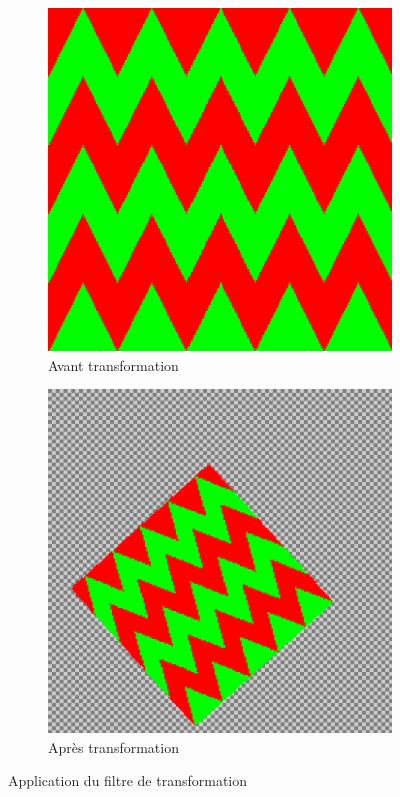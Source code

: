 \documentclass[11pt]{article}
\begin{document}
\begin{figure}[H]
    \centering
    \begin{subfigure}{0.46\textwidth}
    \centering
        \includegraphics[scale=0.15]{transformInit.png}
        \caption{Avant transformation}
        \label{subfig:avanttrasnform}
    \end{subfigure}
    \begin{subfigure}{0.46\textwidth}
    \centering
        \includegraphics[scale=0.16]{transformFinal.png}
        \caption{Après transformation}
        \label{subfig:aprèstransform}
    \end{subfigure}
    \caption{Application du filtre de transformation}
    \label{fig:transform}
\end{figure}
\end{document}
